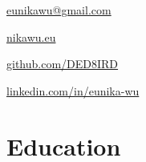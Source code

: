 \documentclass[]{hieudo-build}
\begin{document}
{
	\ci{\faEnvelope} \href{mailto:eunikawu@gmail.com}{ eunikawu@gmail.com } \par
    \ci{\faGlobe} \href{http://nikawu.eu}{ nikawu.eu } \par
	\ci{\faGithub} \href{https://github.com/DED8IRD}{ github.com/DED8IRD } \par
	\ci{\faLinkedinSquare} \href{https://www.linkedin.com/in/eunika-wu/}{ linkedin.com/in/eunika-wu }
}

\section{Education} 
 \\
\smallskip
{}
\smallskip
{}
\sectionsep
\end{document}
